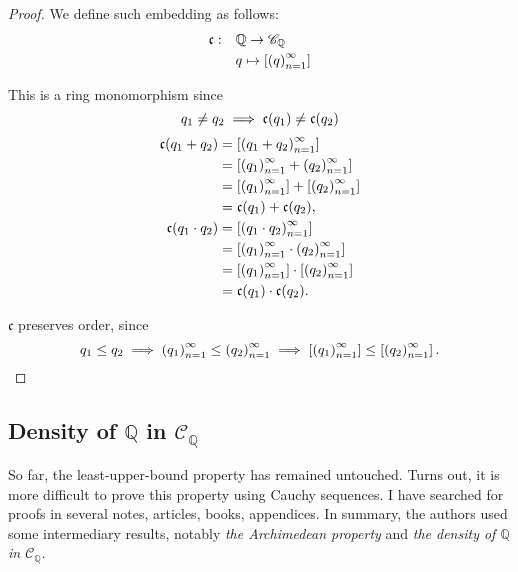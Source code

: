 \begin{proof}
    We define such embedding as follows:
    \begin{align*}
        \mathfrak{c}:\quad & \mathbb{Q}\to\mathscr{C}_{\mathbb{Q}} \\
                           & q\mapsto \left[{{\left({q}\right)}^{\infty}_{n=1}}\right]
    \end{align*}

    This is a ring monomorphism since
    \[
        q_{1}\ne q_{2}\implies \mathfrak{c}(q_{1})\ne\mathfrak{c}(q_{2}) \\
    \]
    \begin{align*}
        \mathfrak{c}(q_{1} + q_{2})    & = \left[{{\left({q_{1} + q_{2}}\right)}^{\infty}_{n=1}}\right]                  \\
                                       & = \left[{{\left({q_{1}}\right)}^{\infty}_{n=1} + {\left({q_{2}}\right)}^{\infty}_{n=1}}\right]            \\
                                       & = \left[{{\left({q_{1}}\right)}^{\infty}_{n=1}}\right] + \left[{{\left({q_{2}}\right)}^{\infty}_{n=1}}\right]    \\
                                       & = \mathfrak{c}(q_{1}) + \mathfrak{c}(q_{2}),   \\
        \mathfrak{c}(q_{1}\cdot q_{2}) & = \left[{{\left({q_{1}\cdot q_{2}}\right)}^{\infty}_{n=1}}\right]               \\
                                       & = \left[{{\left({q_{1}}\right)}^{\infty}_{n=1}\cdot{\left({q_{2}}\right)}^{\infty}_{n=1}}\right]          \\
                                       & = \left[{{\left({q_{1}}\right)}^{\infty}_{n=1}}\right]\cdot\left[{{\left({q_{2}}\right)}^{\infty}_{n=1}}\right]  \\
                                       & = \mathfrak{c}(q_{1})\cdot\mathfrak{c}(q_{2}).
    \end{align*}

    $\mathfrak{c}$ preserves order, since
    \[
        q_{1}\le q_{2}\implies{\left({q_{1}}\right)}^{\infty}_{n=1}\le{\left({q_{2}}\right)}^{\infty}_{n=1}\implies\left[{{\left({q_{1}}\right)}^{\infty}_{n=1}}\right]\le\left[{{\left({q_{2}}\right)}^{\infty}_{n=1}}\right].
    \]
\end{proof}

\subsection{Density of $\mathbb{Q}$ in $\mathscr{C}_{\mathbb{Q}}$}

So far, the least-upper-bound property has remained untouched. Turns out, it is more difficult to prove this property using Cauchy sequences. I have searched for proofs in several notes, articles, books, appendices. In summary, the authors used some intermediary results, notably \textit{the Archimedean property} and \textit{the density of $\mathbb{Q}$ in $\mathscr{C}_{\mathbb{Q}}$}.

